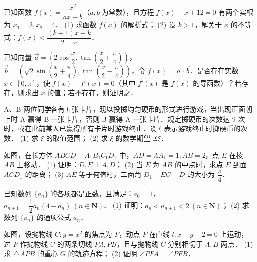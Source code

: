 \begin{question}
已知函数 $f(x) = \dfrac{x^2}{ax + b}$（$a, b$ 为常数），且方程 $f(x) - x + 12 = 0$ 有两个实根为 $x_1 = 3, x_2 = 4$．
(1) 求函数 $f(x)$ 的解析式；
(2) 设 $k > 1$，解关于 $x$ 的不等式：$f(x) < \dfrac{(k+1)x - k}{2-x}$．

\end{question}
\begin{question}
已知向量 $\vec{a} = \left(2\cos\dfrac{x}{2}, \tan\left(\dfrac{x}{2} + \dfrac{\pi}{4}\right)\right)$，$\vec{b} = \left(\sqrt{2}\sin\left(\dfrac{x}{2} + \dfrac{\pi}{4}\right), \tan\left(\dfrac{x}{2} - \dfrac{\pi}{4}\right)\right)$，令 $f(x) = \vec{a} \cdot \vec{b}$．是否存在实数 $x \in [0, \pi]$，使 $f(x) + f'(x) = 0$（其中 $f'(x)$ 是 $f(x)$ 的导函数）？若存在，则求出 $x$ 的值；若不存在，则证明之．

\end{question}
\begin{question}
A、B 两位同学各有五张卡片，现以投掷均匀硬币的形式进行游戏，当出现正面朝上时 A 赢得 B 一张卡片，否则 B 赢得 A 一张卡片．规定掷硬币的次数达 9 次时，或在此前某人已赢得所有卡片时游戏终止．设 $\xi$ 表示游戏终止时掷硬币的次数．
(1) 求 $\xi$ 的取值范围；
(2) 求 $\xi$ 的数学期望 $\mathbf{E}\xi$．

\Needspace{0.4\textheight}
\end{question}
\begin{question}
如图，在长方体 $ABCD - A_1B_1C_1D_1$ 中，$AD = AA_1 = 1, AB = 2$，点 $E$ 在棱 $AB$ 上移动．
(1) 证明：$D_1E \perp A_1D$；
(2) 当 $E$ 为 $AB$ 的中点时，求点 $E$ 到面 $ACD_1$ 的距离；
(3) $AE$ 等于何值时，二面角 $D_1 - EC - D$ 的大小为 $\dfrac{\pi}{4}$．
\nopagebreak[4]
\begin{center}\end{center}
\nopagebreak[4]
\end{question}
\begin{question}
已知数列 $\{a_n\}$ 的各项都是正数，且满足：$a_0 = 1$，$a_{n+1} = \dfrac{1}{2}a_n(4 - a_n)\ (n \in \mathbf{N})$．
(1) 证明：$a_n < a_{n+1} < 2\ (n \in \mathbf{N})$；
(2) 求数列 $\{a_n\}$ 的通项公式 $a_n$．

\Needspace{0.4\textheight}
\end{question}
\begin{question}
如图，设抛物线 $C: y = x^2$ 的焦点为 $F$，动点 $P$ 在直线 $l: x - y - 2 = 0$ 上运动，过 $P$ 作抛物线 $C$ 的两条切线 $PA, PB$，且与抛物线 $C$ 分别相切于 $A, B$ 两点．
(1) 求 $\triangle APB$ 的重心 $G$ 的轨迹方程；
(2) 证明 $\angle PFA = \angle PFB$．
\nopagebreak[4]
\begin{center}\end{center}
\nopagebreak[4]

\end{question}